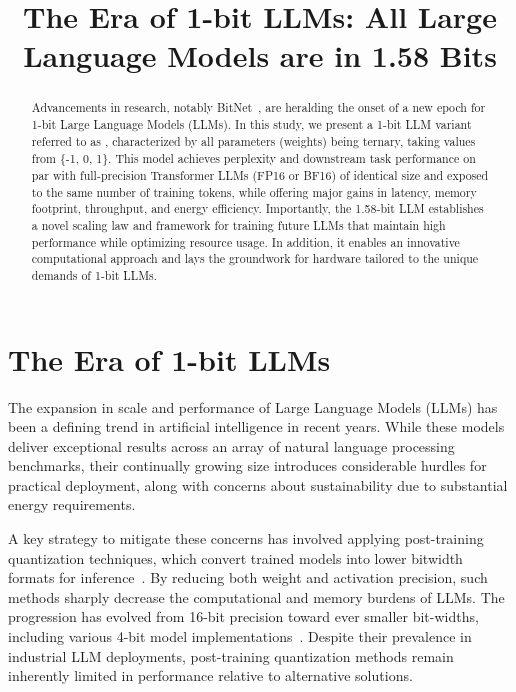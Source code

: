 \title{The Era of 1-bit LLMs: All Large Language Models are in 1.58 Bits}

\begin{abstract}
Advancements in research, notably BitNet~\cite{bitnet}, are heralding the onset of a new epoch for 1-bit Large Language Models (LLMs). In this study, we present a 1-bit LLM variant referred to as \textbf{}, characterized by all parameters (weights) being ternary, taking values from \{-1, 0, 1\}. This model achieves perplexity and downstream task performance on par with full-precision Transformer LLMs (FP16 or BF16) of identical size and exposed to the same number of training tokens, while offering major gains in latency, memory footprint, throughput, and energy efficiency. Importantly, the 1.58-bit LLM establishes a novel scaling law and framework for training future LLMs that maintain high performance while optimizing resource usage. In addition, it enables an innovative computational approach and lays the groundwork for hardware tailored to the unique demands of 1-bit LLMs.
\end{abstract}

\section{The Era of 1-bit LLMs}

The expansion in scale and performance of Large Language Models (LLMs) has been a defining trend in artificial intelligence in recent years. While these models deliver exceptional results across an array of natural language processing benchmarks, their continually growing size introduces considerable hurdles for practical deployment, along with concerns about sustainability due to substantial energy requirements.

A key strategy to mitigate these concerns has involved applying post-training quantization techniques, which convert trained models into lower bitwidth formats for inference~\cite{smoothquant, gptq, quip, quip_sharp}. By reducing both weight and activation precision, such methods sharply decrease the computational and memory burdens of LLMs. The progression has evolved from 16-bit precision toward ever smaller bit-widths, including various 4-bit model implementations~\cite{gptq, awq}. Despite their prevalence in industrial LLM deployments, post-training quantization methods remain inherently limited in performance relative to alternative solutions.

